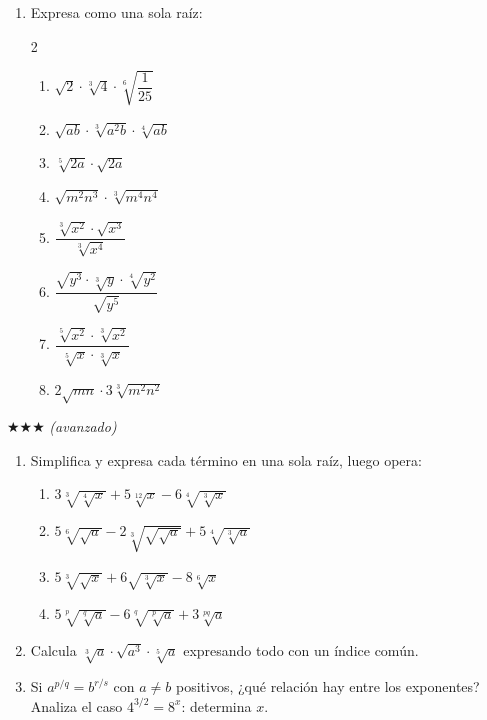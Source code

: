 \documentclass[11pt, letterpaper]{article}
\begin{document}
\begin{enumerate}[label=\textbf{\arabic*.}, leftmargin=*, resume]
  \item Expresa como una sola raíz:
  \begin{multicols}{2}
  \begin{enumerate}[label=\alph*)]
    \item $\sqrt{2}\cdot\sqrt[3]{4}\cdot\sqrt[6]{\dfrac{1}{25}}$
    \item $\sqrt{ab}\cdot\sqrt[3]{a^2b}\cdot\sqrt[4]{ab}$
    \item $\sqrt[5]{2a}\cdot\sqrt{2a}$
    \item $\sqrt{m^2n^3}\cdot\sqrt[3]{m^4n^4}$
    \item $\dfrac{\sqrt[3]{x^2}\cdot\sqrt{x^3}}{\sqrt[3]{x^4}}$
    \item $\dfrac{\sqrt{y^3}\cdot\sqrt[3]{y}\cdot\sqrt[4]{y^2}}{\sqrt{y^5}}$
    \item $\dfrac{\sqrt[5]{x^2}\cdot\sqrt[3]{x^2}}{\sqrt[5]{x}\cdot\sqrt[3]{x}}$
    \item $2\sqrt{mn}\cdot 3\sqrt[3]{m^2n^2}$
  \end{enumerate}
  \end{multicols}
\end{enumerate}

$\bigstar\bigstar\bigstar$ \textit{(avanzado)}

\begin{enumerate}[label=\textbf{\arabic*.}, leftmargin=*, resume]
  \item Simplifica y expresa cada término en una sola raíz, luego opera:
  \begin{enumerate}[label=\alph*)]
    \item $3\sqrt[3]{\sqrt[4]{x}}+5\sqrt[12]{x}-6\sqrt[4]{\sqrt[3]{x}}$
    \item $5\sqrt[6]{\sqrt{a}}-2\sqrt[3]{\sqrt{\sqrt{a}}}+5\sqrt[4]{\sqrt[3]{a}}$
    \item $5\sqrt[3]{\sqrt{x}}+6\sqrt{\sqrt[3]{x}}-8\sqrt[6]{x}$
    \item $5\sqrt[p]{\sqrt[q]{a}}-6\sqrt[q]{\sqrt[p]{a}}+3\sqrt[pq]{a}$
  \end{enumerate}

  \item Calcula $\sqrt[3]{a}\cdot\sqrt{a^3}\cdot\sqrt[5]{a}$ expresando todo con un índice común.

  \item Si $a^{p/q}=b^{r/s}$ con $a\neq b$ positivos, ¿qué relación hay entre los exponentes? Analiza el caso $4^{3/2}=8^x$: determina $x$.
\end{enumerate}
\end{document}
